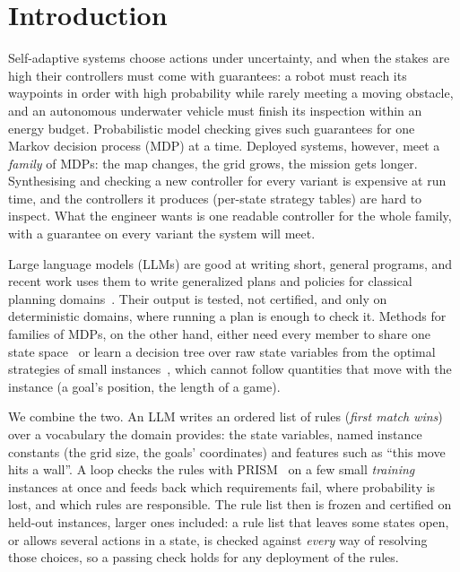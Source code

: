 \section{Introduction}\label{sec:intro}

Self-adaptive systems choose actions under uncertainty, and when the stakes are high their controllers must come
with guarantees: a robot must reach its waypoints in order with high probability while rarely meeting a moving
obstacle, and an autonomous underwater vehicle must finish its inspection within an energy budget. Probabilistic
model checking gives such guarantees for one Markov decision process (MDP) at a time. Deployed systems, however,
meet a \emph{family} of MDPs: the map changes, the grid grows, the mission gets longer. Synthesising and checking a
new controller for every variant is expensive at run time, and the controllers it produces (per-state strategy
tables) are hard to inspect. What the engineer wants is one readable controller for the whole family, with a
guarantee on every variant the system will meet.

Large language models (LLMs) are good at writing short, general programs, and recent work uses them to write
generalized plans and policies for classical planning domains~\cite{silver2024generalized,stein2026strategy}.
Their output is tested, not certified, and only on deterministic domains, where running a plan is enough to check
it. Methods for families of MDPs, on the other hand, either need every member to share one state
space~\cite{andriushchenko2024trees,heck2026smpmc} or learn a decision tree over raw state variables from the
optimal strategies of small instances~\cite{azeem2025onetwothreego}, which cannot follow quantities that move with
the instance (a goal's position, the length of a game).

We combine the two. An LLM writes an ordered list of rules (\emph{first match wins}) over a vocabulary the domain
provides: the state variables, named instance constants (the grid size, the goals' coordinates) and features such as
``this move hits a wall''. A loop checks the rules with PRISM~\cite{kwiatkowska2011prism} on a few small
\emph{training} instances at once and feeds back which requirements fail, where probability is lost, and which rules
are responsible. The rule list then is frozen and certified on held-out instances, larger ones included: a rule list
that leaves some states open, or allows several actions in a state, is checked against \emph{every} way of
resolving those choices, so a passing check holds for any deployment of the rules.

